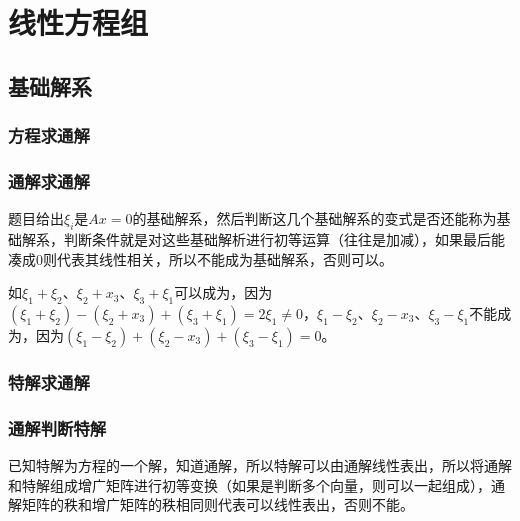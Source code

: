 \setcounter{tocdepth}{4}
\setcounter{secnumdepth}{4}
\renewcommand{\baselinestretch}{1.5}
\chapter{线性方程组}
\section{基础解系}

\subsection{方程求通解}

\subsection{通解求通解}

题目给出$\xi_i$是$Ax=0$的基础解系，然后判断这几个基础解系的变式是否还能称为基础解系，判断条件就是对这些基础解析进行初等运算（往往是加减），如果最后能凑成0则代表其线性相关，所以不能成为基础解系，否则可以。

如$\xi_1+\xi_2$、$\xi_2+x_3$、$\xi_3+\xi_1$可以成为，因为$(\xi_1+\xi_2)-(\xi_2+x_3)+(\xi_3+\xi_1)=2\xi_1\neq0$，$\xi_1-\xi_2$、$\xi_2-x_3$、$\xi_3-\xi_1$不能成为，因为$(\xi_1-\xi_2)+(\xi_2-x_3)+(\xi_3-\xi_1)=0$。

\subsection{特解求通解}

\subsection{通解判断特解}

已知特解为方程的一个解，知道通解，所以特解可以由通解线性表出，所以将通解和特解组成增广矩阵进行初等变换（如果是判断多个向量，则可以一起组成），通解矩阵的秩和增广矩阵的秩相同则代表可以线性表出，否则不能。

